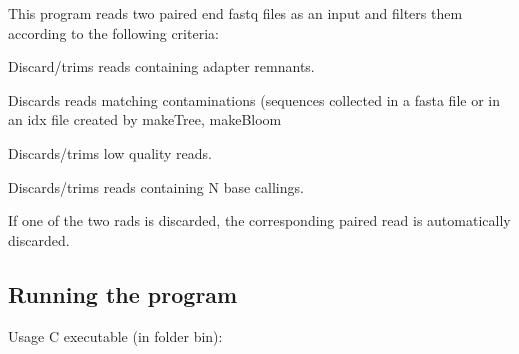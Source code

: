This program reads two paired end {\ttfamily fastq} files as an input and filters them according to the following criteria\+:
\begin{DoxyItemize}
\item Discard/trims reads containing adapter remnants.
\item Discards reads matching contaminations (sequences collected in a {\ttfamily fasta} file or in an {\ttfamily idx} file created by {\ttfamily make\+Tree}, {\ttfamily make\+Bloom}
\item Discards/trims low quality reads.
\item Discards/trims reads containing N base callings.
\end{DoxyItemize}

If one of the two rads is discarded, the corresponding paired read is automatically discarded.

\subsection*{Running the program}

Usage {\ttfamily C} executable (in folder {\ttfamily bin})\+:


